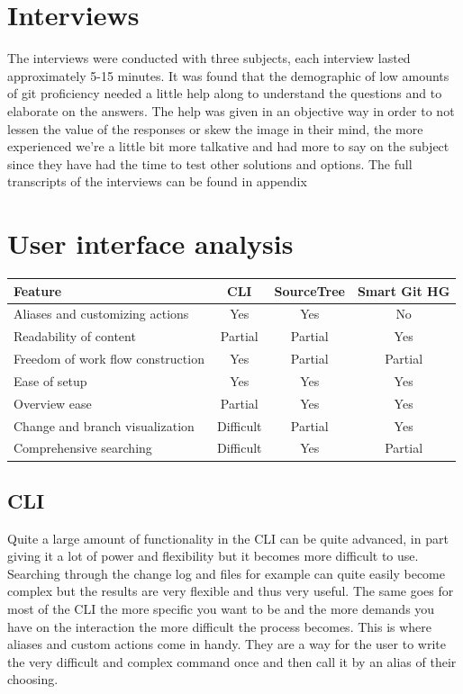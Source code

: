 \documentclass[a4paper,oneside]{bth} %
\begin{document}
			\section{Interviews}
			The interviews were conducted with three subjects, each interview lasted approximately 5-15 minutes. It was found that the demographic of low amounts of git proficiency needed a little help along to understand the questions and to elaborate on the answers. The help was given in an objective way in order to not lessen the value of the responses or skew the image in their mind, the more experienced we're a little bit more talkative and had more to say on the subject since they have had the time to test other solutions and options. 
			The full transcripts of the interviews can be found in appendix %
			\section{User interface analysis}
				\begin{center}
					\begin{tabular}{ | p{5cm} | c | c | c | }
					\hline
					Feature & CLI & SourceTree & Smart Git HG \\ 
					\hline
					Aliases and customizing actions & Yes & Yes & No \\
					\hline
					Readability of content & Partial & Partial & Yes \\
					\hline
					Freedom of work flow construction & Yes & Partial & Partial \\
					\hline
					Ease of setup & Yes & Yes & Yes \\
					\hline
					Overview ease & Partial & Yes & Yes \\
					\hline
					Change and branch visualization & Difficult & Partial & Yes \\
					\hline
					Comprehensive searching & Difficult & Yes & Partial \\
					\hline
					\end{tabular}
					 \label{tab:UI-Analysis}
				\end{center}
				\subsection{CLI}
				Quite a large amount of functionality in the CLI can be quite advanced, in part giving it a lot of power and flexibility but it becomes more difficult to use. Searching through the change log and files for example can quite easily become complex but the results are very flexible and thus very useful. The same goes for most of the CLI the more specific you want to be and the more demands you have on the interaction the more difficult the process becomes. This is where aliases and custom actions come in handy. They are a way for the user to write the very difficult and complex command once and then call it by an alias of their choosing. 
\end{document}
